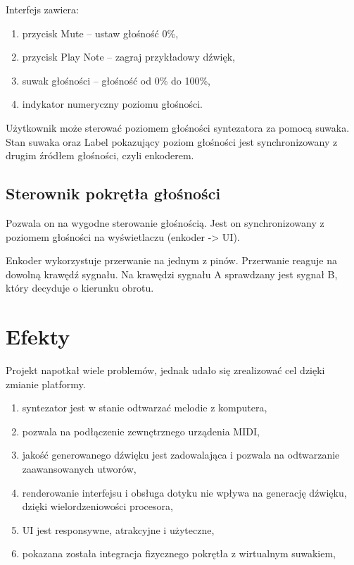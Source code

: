 \documentclass[12pt,a4paper,openright,dvipsnames]{mwart}
\begin{document}
Interfejs zawiera:
\begin{enumerate}
    \item przycisk Mute -- ustaw głośność 0\%,
    \item przycisk Play Note -- zagraj przykładowy dźwięk,
    \item suwak głośności -- głośność od 0\% do 100\%,
    \item indykator numeryczny poziomu głośności.
\end{enumerate}

Użytkownik może sterować poziomem głośności syntezatora
za pomocą suwaka.
Stan suwaka oraz Label pokazujący poziom głośności
jest synchronizowany z drugim źródłem głośności, czyli enkoderem.



\subsection{Sterownik pokrętła głośności}

Pozwala on na wygodne sterowanie głośnością.
Jest on synchronizowany z poziomem głośności
na wyświetlaczu (enkoder -> UI).

Enkoder wykorzystuje przerwanie na jednym z pinów.
Przerwanie reaguje na dowolną krawędź sygnału.
Na krawędzi sygnału A sprawdzany jest sygnał B,
który decyduje o kierunku obrotu.



\section{Efekty}

Projekt napotkał wiele problemów, jednak udało się
zrealizować cel dzięki zmianie platformy.

\begin{enumerate}
    \item syntezator jest w stanie odtwarzać melodie z komputera,
    \item pozwala na podłączenie zewnętrznego urządenia MIDI,
    \item jakość generowanego dźwięku jest zadowalająca i pozwala
    na odtwarzanie zaawansowanych utworów,
    \item renderowanie interfejsu i obsługa dotyku nie wpływa na generację
    dźwięku, dzięki wielordzeniowości procesora,
    \item UI jest responsywne, atrakcyjne i użyteczne,
    \item pokazana została integracja fizycznego pokrętła
    z wirtualnym suwakiem,
\end{enumerate}
\end{document}
